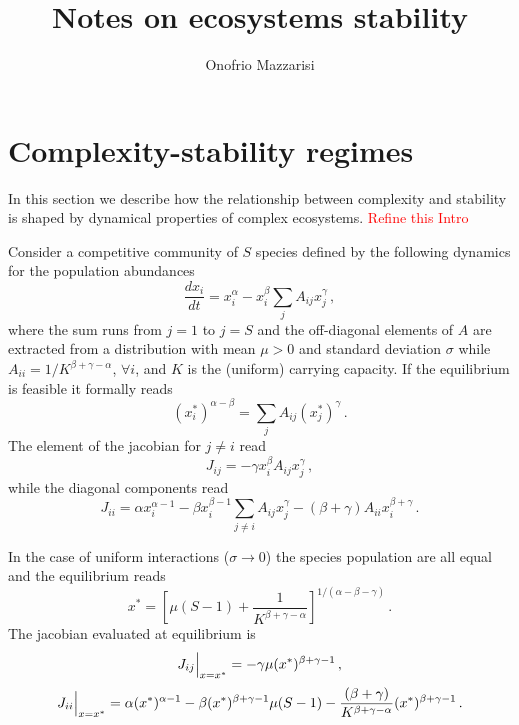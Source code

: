 \documentclass[10pt]{article}
\title{{\bf Notes on ecosystems stability}}
\author{Onofrio Mazzarisi}
\begin{document}


\maketitle

\section{Complexity-stability regimes}
\label{sec: complexity-stability regimes}
In this section we describe how the relationship between complexity and stability
is shaped by dynamical properties of complex ecosystems.
\textcolor{red}{Refine this Intro}

Consider a competitive community of $S$ species
defined by the following dynamics for the population abundances
\begin{equation}
    \frac{dx_i}{dt}=x_i^{\alpha}-x_i^{\beta}\sum_{j}A_{ij}x_j^{\gamma} \, ,
\end{equation}
where the sum runs from $j=1$ to $j=S$ and the off-diagonal elements
of $A$ are extracted from a distribution
with mean $\mu>0$ and standard deviation $\sigma$ while $A_{ii}=1/K^{\beta+\gamma-\alpha}$, $\forall i$,
and $K$ is the (uniform) carrying capacity.
If the equilibrium is feasible it formally reads
\begin{equation}
    (x_i^*)^{\alpha-\beta} = \sum_{j}A_{ij}(x_j^*)^{\gamma} \, .
\end{equation}
The element of the jacobian for $j\neq i$ read
\begin{equation}
    J_{ij} = -\gamma x_i^{\beta}A_{ij}x_j^{\gamma} \, ,
\end{equation}
while the diagonal components read
\begin{equation}
    J_{ii} = \alpha x_i^{\alpha-1}-\beta x_i^{\beta-1}\sum_{j\neq i}A_{ij}x_j^{\gamma}
    - (\beta+\gamma)A_{ii}x_i^{\beta+\gamma} \, .
\end{equation}

In the case of uniform interactions ($\sigma\to0$)
the species population are all equal and the equilibrium reads
\begin{equation}
    x^*=\left[\mu(S-1)+\frac{1}{K^{\beta+\gamma-\alpha}}\right]^{1/(\alpha-\beta-\gamma)} \, .
\end{equation}
The jacobian evaluated at equilibrium is
\begin{equation}
    J_{ij}\Big{|}_{x=x^*} = -\gamma \mu (x^*)^{\beta+\gamma-1} \, ,
\end{equation}
\begin{equation}
    J_{ii}\Big{|}_{x=x^*} = \alpha (x^*)^{\alpha-1}-\beta (x^*)^{\beta+\gamma-1}\mu(S-1)
                            -\frac{(\beta+\gamma)}{K^{\beta+\gamma-\alpha}}(x^*)^{\beta+\gamma-1}\, .
\end{equation}
\end{document}
